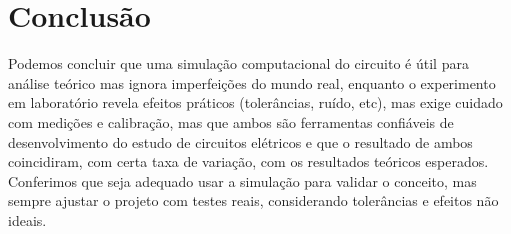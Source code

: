\section{Conclusão}

Podemos concluir que uma simulação computacional do circuito é útil para análise teórico mas ignora imperfeições do mundo real, enquanto o experimento em laboratório revela efeitos práticos (tolerâncias, ruído, etc), mas exige cuidado com medições e calibração, mas que ambos são ferramentas confiáveis de desenvolvimento do estudo de circuitos elétricos e que o resultado de ambos coincidiram, com certa taxa de variação, com os resultados teóricos esperados. Conferimos que seja adequado usar a simulação para validar o conceito, mas sempre ajustar o projeto com testes reais, considerando tolerâncias e efeitos não ideais.